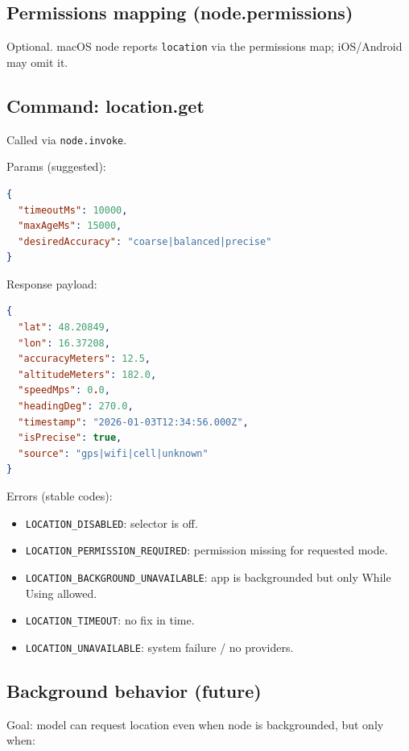 \subsection{Permissions mapping (node.permissions)}


Optional. macOS node reports \texttt{location} via the permissions map; iOS/Android may omit it.

\subsection{Command: location.get}


Called via \texttt{node.invoke}.

Params (suggested):

\begin{lstlisting}[language=json]
{
  "timeoutMs": 10000,
  "maxAgeMs": 15000,
  "desiredAccuracy": "coarse|balanced|precise"
}
\end{lstlisting}


Response payload:

\begin{lstlisting}[language=json]
{
  "lat": 48.20849,
  "lon": 16.37208,
  "accuracyMeters": 12.5,
  "altitudeMeters": 182.0,
  "speedMps": 0.0,
  "headingDeg": 270.0,
  "timestamp": "2026-01-03T12:34:56.000Z",
  "isPrecise": true,
  "source": "gps|wifi|cell|unknown"
}
\end{lstlisting}


Errors (stable codes):

\begin{itemize}
  \item \texttt{LOCATION\_DISABLED}: selector is off.
  \item \texttt{LOCATION\_PERMISSION\_REQUIRED}: permission missing for requested mode.
  \item \texttt{LOCATION\_BACKGROUND\_UNAVAILABLE}: app is backgrounded but only While Using allowed.
  \item \texttt{LOCATION\_TIMEOUT}: no fix in time.
  \item \texttt{LOCATION\_UNAVAILABLE}: system failure / no providers.
\end{itemize}


\subsection{Background behavior (future)}


Goal: model can request location even when node is backgrounded, but only when:


